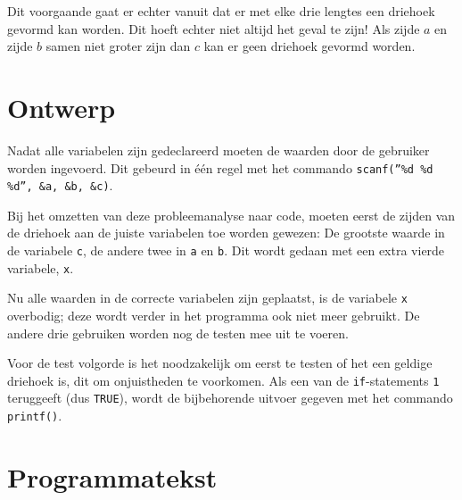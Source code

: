 \documentclass[a4paper,10pt]{article}
\begin{document}
Dit voorgaande gaat er echter vanuit dat er met elke drie lengtes een driehoek gevormd kan worden. Dit hoeft echter niet altijd het geval te zijn! Als zijde $a$ en zijde $b$ samen niet groter zijn dan $c$ kan er geen driehoek gevormd worden.

\section{Ontwerp}
Nadat alle variabelen zijn gedeclareerd moeten de waarden door de gebruiker worden ingevoerd. Dit gebeurd in \'e\'en regel met het commando {\tt scanf(\textquotedblright\%d \%d \%d\textquotedblright, \&a, \&b, \&c)}.

Bij het omzetten van deze probleemanalyse naar code, moeten eerst de zijden van de driehoek aan de juiste variabelen toe worden gewezen: De grootste waarde in de variabele {\tt c}, de andere twee in {\tt a} en {\tt b}. Dit wordt gedaan met een extra vierde variabele, {\tt x}.

Nu alle waarden in de correcte variabelen zijn geplaatst, is de variabele {\tt x} overbodig; deze wordt verder in het programma ook niet meer gebruikt. De andere drie gebruiken worden nog de testen mee uit te voeren.

Voor de test volgorde is het noodzakelijk om eerst te testen of het een geldige driehoek is, dit om onjuistheden te voorkomen. Als een van de {\tt if}-statements {\tt 1} teruggeeft (dus {\tt TRUE}), wordt de bijbehorende uitvoer gegeven met het commando {\tt printf()}.

\newpage

\section{Programmatekst}


\end{document}
